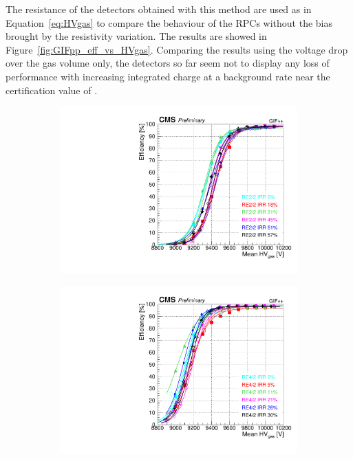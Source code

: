 	The resistance of the detectors obtained with this method are used as in Equation~\ref{eq:HVgas} to compare the behaviour of the RPCs without the bias brought by the resistivity variation. The results are showed in Figure~\ref{fig:GIFpp_eff_vs_HVgas}. Comparing the results using the voltage drop over the gas volume only, the detectors so far seem not to display any loss of performance with increasing integrated charge at a background rate near the certification value of .
	
	\begin{figure}[H]
    	\begin{subfigure}{0.5\linewidth}
			\centering
    		\includegraphics[width = \linewidth]{fig/chapt5/efficiency_vs_HVgas_RE2_2-IRR.pdf}
        	\caption{\label{fig:GIFpp_eff_vs_HVgas:A}}
    	\end{subfigure}
    	\begin{subfigure}{0.5\linewidth}
			\centering
    		\includegraphics[width = \linewidth]{fig/chapt5/efficiency_vs_HVgas_RE4_2-IRR.pdf}

\end{subfigure}
\end{figure}
